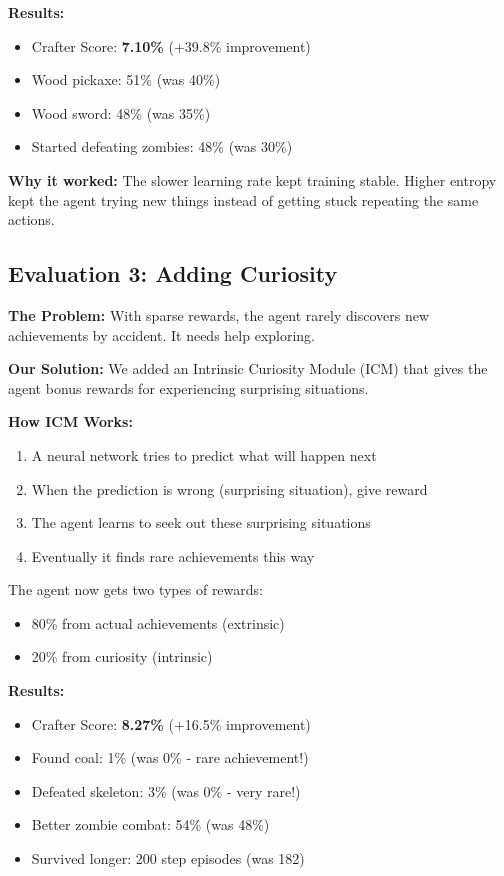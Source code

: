 \documentclass[conference]{IEEEtran}
\begin{document}
\textbf{Results:}
\begin{itemize}
    \item Crafter Score: \textbf{7.10\%} (+39.8\% improvement)
    \item Wood pickaxe: 51\% (was 40\%)
    \item Wood sword: 48\% (was 35\%)
    \item Started defeating zombies: 48\% (was 30\%)
\end{itemize}

\textbf{Why it worked:} The slower learning rate kept training stable. Higher entropy kept the agent trying new things instead of getting stuck repeating the same actions.

\subsection{Evaluation 3: Adding Curiosity}

\textbf{The Problem:} With sparse rewards, the agent rarely discovers new achievements by accident. It needs help exploring.

\textbf{Our Solution:} We added an Intrinsic Curiosity Module (ICM) that gives the agent bonus rewards for experiencing surprising situations.

\textbf{How ICM Works:}
\begin{enumerate}
    \item A neural network tries to predict what will happen next
    \item When the prediction is wrong (surprising situation), give reward
    \item The agent learns to seek out these surprising situations
    \item Eventually it finds rare achievements this way
\end{enumerate}

The agent now gets two types of rewards:
\begin{itemize}
    \item 80\% from actual achievements (extrinsic)
    \item 20\% from curiosity (intrinsic)
\end{itemize}

\textbf{Results:}
\begin{itemize}
    \item Crafter Score: \textbf{8.27\%} (+16.5\% improvement)
    \item Found coal: 1\% (was 0\% - rare achievement!)
    \item Defeated skeleton: 3\% (was 0\% - very rare!)
    \item Better zombie combat: 54\% (was 48\%)
    \item Survived longer: 200 step episodes (was 182)
\end{itemize}
\end{document}
